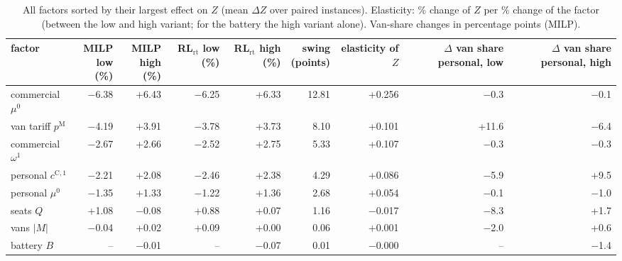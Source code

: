 \begin{table}[H]\centering
\scriptsize
\caption{All factors sorted by their largest effect on $Z$ (mean $\Delta Z$ over paired instances). Elasticity: \% change of $Z$ per \% change of the factor (between the low and high variant; for the battery the high variant alone). Van-share changes in percentage points (MILP).}\label{tab:tornado}
\begin{adjustbox}{max width=\textwidth}\begin{tabular}{lrrrrrrrr}\toprule
factor & \shortstack{MILP\\low (\%)} & \shortstack{MILP\\high (\%)} & \shortstack{RL$_{\mathrm{rt}}$\\low (\%)} & \shortstack{RL$_{\mathrm{rt}}$\\high (\%)} & \shortstack{swing\\(points)} & \shortstack{elasticity\\of $Z$} & \shortstack{$\Delta$ van share\\personal, low} & \shortstack{$\Delta$ van share\\personal, high} \\ \midrule
commercial $\mu^{0}$ & $-$6.38 & +6.43 & $-$6.25 & +6.33 & 12.81 & +0.256 & $-$0.3 & $-$0.1 \\
van tariff $p^{\mathrm M}$ & $-$4.19 & +3.91 & $-$3.78 & +3.73 & 8.10 & +0.101 & +11.6 & $-$6.4 \\
commercial $\omega^{1}$ & $-$2.67 & +2.66 & $-$2.52 & +2.75 & 5.33 & +0.107 & $-$0.3 & $-$0.3 \\
personal $c^{\mathrm C,1}$ & $-$2.21 & +2.08 & $-$2.46 & +2.38 & 4.29 & +0.086 & $-$5.9 & +9.5 \\
personal $\mu^{0}$ & $-$1.35 & +1.33 & $-$1.22 & +1.36 & 2.68 & +0.054 & $-$0.1 & $-$1.0 \\
seats $Q$ & +1.08 & $-$0.08 & +0.88 & +0.07 & 1.16 & $-$0.017 & $-$8.3 & +1.7 \\
vans $|M|$ & $-$0.04 & +0.02 & +0.09 & +0.00 & 0.06 & +0.001 & $-$2.0 & +0.6 \\
battery $B$ & -- & $-$0.01 & -- & $-$0.07 & 0.01 & $-$0.000 & -- & $-$1.4 \\
\bottomrule\end{tabular}\end{adjustbox}\end{table}
